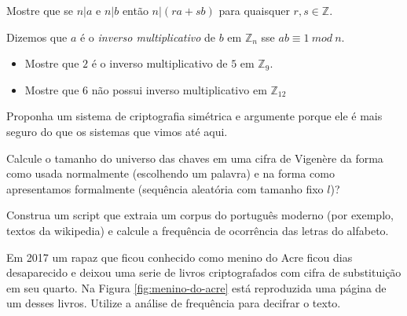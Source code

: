 \begin{exercicio}
  Mostre que se $n|a$ e $n|b$ então $n|(ra + sb)$ para quaisquer $r, s \in \mathbb{Z}$.
\end{exercicio}

\begin{exercicio}
  Dizemos que $a$ é o {\em inverso multiplicativo} de $b$ em $\mathbb{Z}_n$ sse $ab \equiv 1\ mod\ n$.
\begin{itemize}
\item Mostre que $2$ é o inverso multiplicativo de $5$ em $\mathbb{Z}_9$.
\item Mostre que $6$ não possui inverso multiplicativo em $\mathbb{Z}_{12}$
\end{itemize}
\end{exercicio}

\begin{exercicio}
  Proponha um sistema de criptografia simétrica e argumente porque ele é mais seguro do que os sistemas que vimos até aqui.
\end{exercicio}

\begin{exercicio}
Calcule o tamanho do universo das chaves em uma cifra de Vigenère da forma como usada normalmente (escolhendo um palavra) e na forma como apresentamos formalmente (sequência aleatória com tamanho fixo $l$)?
\end{exercicio}


\begin{exercicio}
Construa um script que extraia um corpus do português moderno (por exemplo, textos da wikipedia) e calcule a frequência de ocorrência das letras do alfabeto.
\end{exercicio}

\begin{exercicio}
Em 2017 um rapaz que ficou conhecido como menino do Acre ficou dias desaparecido e deixou uma serie de livros criptografados com cifra de substituição em seu quarto.
Na Figura \ref{fig:menino-do-acre} está reproduzida uma página de um desses livros.
Utilize a análise de frequência para decifrar o texto.
\end{exercicio}

